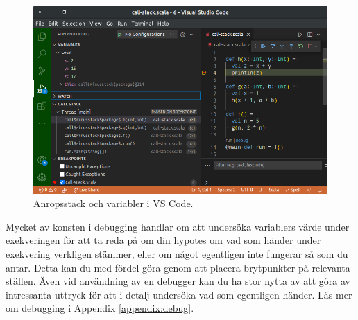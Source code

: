 \begin{figure}
\centering
\includegraphics[width=1.0\textwidth]{../img/vscode-trace}
\caption{Anropsstack och variabler i VS Code.\label{appendix-ide:vscode-trace}}
\end{figure}

Mycket av konsten i debugging handlar om att undersöka variablers värde under exekveringen för att ta reda på om din hypotes om vad som händer under exekvering verkligen stämmer, eller om något egentligen inte fungerar så som du antar. Detta kan du med fördel göra genom att placera brytpunkter på relevanta ställen. Även vid användning av en debugger kan du ha stor nytta av att göra  av intressanta uttryck för att i detalj undersöka vad som egentligen händer. Läs mer om debugging i Appendix \ref{appendix:debug}.
 